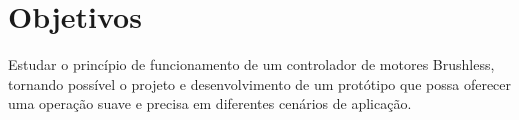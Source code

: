 \section{Objetivos}
Estudar o princípio de funcionamento de um controlador de motores Brushless, tornando possível o projeto e desenvolvimento de um protótipo que possa oferecer uma operação suave e precisa em diferentes cenários de aplicação.

